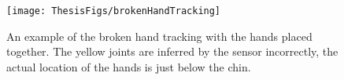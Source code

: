 \begin{figure}[h!]
        \centering
        \texttt{[image: ThesisFigs/brokenHandTracking]}
        \caption{An example of the broken hand tracking with the hands placed together. The yellow joints are inferred by the sensor incorrectly, the actual location of the hands is just below the chin.}\label{fig:brokht}
\end{figure}


